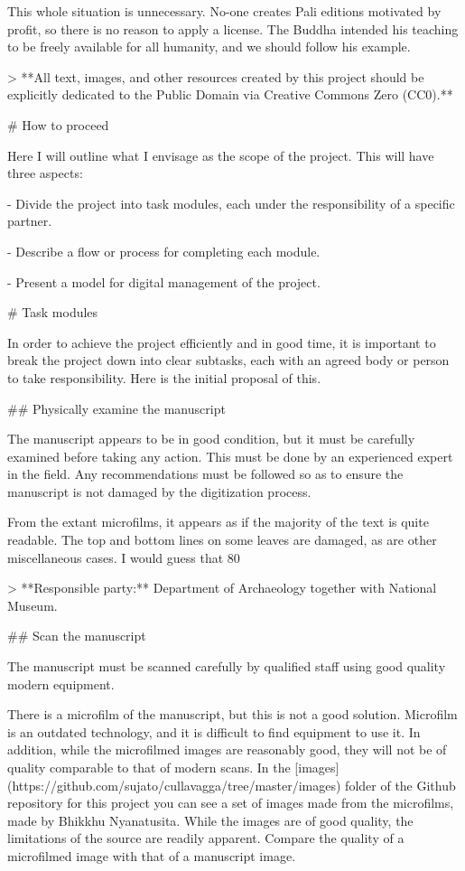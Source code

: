 \documentclass[11pt, openany,a5paper]{article}
\begin{document}
\begin{markdown}
This whole situation is unnecessary. No-one creates Pali editions motivated by profit, so there is no reason to apply a license. The Buddha intended his teaching to be freely available for all humanity, and we should follow his example.

> **All text, images, and other resources created by this project should be explicitly dedicated to the Public Domain via Creative Commons Zero (CC0).**

# How to proceed

Here I will outline what I envisage as the scope of the project. This will have three aspects:

- Divide the project into task modules, each under the responsibility of a specific partner.

- Describe a flow or process for completing each module.

- Present a model for digital management of the project.

# Task modules

In order to achieve the project efficiently and in good time, it is important to break the project down into clear subtasks, each with an agreed body or person to take responsibility. Here is the initial proposal of this.

## Physically examine the manuscript

The manuscript appears to be in good condition, but it must be carefully examined before taking any action. This must be done by an experienced expert in the field. Any recommendations must be followed so as to ensure the manuscript is not damaged by the digitization process.

From the extant microfilms, it appears as if the majority of the text is quite readable. The top and bottom lines on some leaves are damaged, as are other miscellaneous cases. I would guess that 80%

   > **Responsible party:** Department of Archaeology together with National Museum.

## Scan the manuscript

The manuscript must be scanned carefully by qualified staff using good quality modern equipment.

There is a microfilm of the manuscript, but this is not a good solution. Microfilm is an outdated technology, and it is difficult to find equipment to use it. In addition, while the microfilmed images are reasonably good, they will not be of quality comparable to that of modern scans. In the [images](https://github.com/sujato/cullavagga/tree/master/images) folder of the Github repository for this project you can see a set of images made from the microfilms, made by Bhikkhu Nyanatusita. While the images are of good quality, the limitations of the source are readily apparent. Compare the quality of a microfilmed image with that of a manuscript image.


\end{markdown}
\end{document}
